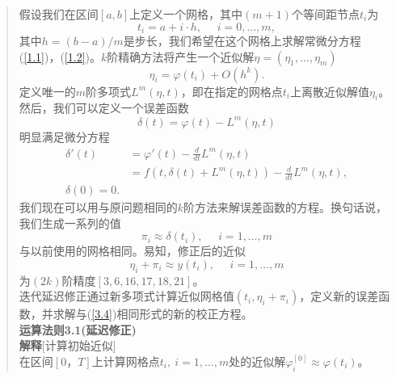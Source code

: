 \documentclass{article}
\begin{document}
\begin{CJK}{UTF8}{gkai}
\begin{quotation}
假设我们在区间$[a, b]$上定义一个网格，其中$(m+1)$个等间距节点$t_i$为\\
\begin{equation}
t_i=a+i \cdot h,~~~~~~i=0,\ldots,m,
\end{equation}
其中$h=(b-a)/m$是步长，我们希望在这个网格上求解常微分方程(\ref{1.1})，(\ref{1.2})。$k$阶精确方法将产生一个近似解$\eta=(\eta_1,\ldots,\eta_m)$\\
\begin{equation}
\eta_i= \varphi(t_i)+O(h^k).
\end{equation}
定义唯一的$m$阶多项式$L^m(\eta,t)$，即在指定的网格点$t_i$上离散近似解值$\eta_i$。然后，我们可以定义一个误差函数\\
\begin{equation}
\delta(t)= \varphi(t)-L^m(\eta,t)
\end{equation}
明显满足微分方程\\
\begin{equation}
\begin{aligned}
\delta'(t)&=\varphi'(t)-\frac{d}{dt}L^m(\eta,t)\\&=f(t,\delta(t)+L^m(\eta,t))-\frac{d}{dt}L^m(\eta,t),\\
\delta(0)=0.
\end{aligned}
\label{3.4}
\end{equation}
我们现在可以用与原问题相同的$k$阶方法来解误差函数的方程。换句话说，我们生成一系列的值\\
\begin{equation}
\pi_i\approx \delta(t_i),~~~~~~i=1,\ldots,m
\end{equation}
与以前使用的网格相同。易知，修正后的近似\\
\begin{equation}
\eta_i+\pi_i \approx y(t_i),~~~~~~i=1,\ldots,m
\end{equation}
为$(2k)$阶精度$[3, 6, 16, 17, 18, 21]$。\\

迭代延迟修正通过新多项式计算近似网格值$(t_i,\eta_i+\pi_i)$，定义新的误差函数，并求解与(\ref{3.4})相同形式的新的校正方程。\\

\textbf{运算法则3.1(延迟修正)}\\

\textbf{解释}[计算初始近似]\\

在区间$[0，T]$上计算网格点$t_i,~i=1,\ldots,m$处的近似解$\varphi^{[0]}_i \approx \varphi(t_i)$。\\


\end{quotation}
\end{CJK}
\end{document}
